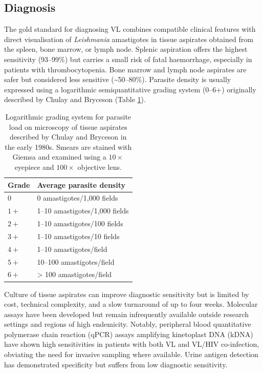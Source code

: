 \subsection{Diagnosis}

The gold standard for diagnosing VL combines compatible clinical features with direct visualisation of \textit{Leishmania} amastigotes in tissue aspirates obtained from the spleen, bone marrow, or lymph node. Splenic aspiration offers the highest sensitivity (93--99\%) but carries a small risk of fatal haemorrhage, especially in patients with thrombocytopenia\cite{sundar2002a, kager1983}. Bone marrow and lymph node aspirates are safer but considered less sensitive (\textasciitilde50--80\%)\cite{farrar2023manson,burza2018}. Parasite density is usually expressed using a logarithmic semiquantitative grading system (0--6+) originally described by Chulay and Bryceson (Table \ref{tab:grading})\cite{chulay1983}.


\begin{table}[ht]
  \centering
  \caption{Logarithmic grading system for parasite load on microscopy of tissue aspirates described by Chulay and Bryceson in the early 1980s\cite{chulay1983}. Smears are stained with Giemsa and examined using a $10\times$ eyepiece and $100\times$ objective lens.}
  \begin{tabular}{ll}
    \toprule
    \textbf{Grade} & \textbf{Average parasite density} \\
    \midrule
    $0$            & 0 amastigotes/1,000 fields        \\
    $1+$           & 1--10 amastigotes/1,000 fields    \\
    $2+$           & 1--10 amastigotes/100 fields      \\
    $3+$           & 1--10 amastigotes/10 fields       \\
    $4+$           & 1--10 amastigotes/field           \\
    $5+$           & 10--100 amastigotes/field         \\
    $6+$           & > 100 amastigotes/field           \\
    \bottomrule
  \end{tabular}
  \label{tab:grading}
\end{table}

Culture of tissue aspirates can improve diagnostic sensitivity but is limited by cost, technical complexity, and a slow turnaround of up to four weeks. Molecular assays have been developed but remain infrequently available outside research settings and regions of high endemicity. Notably, peripheral blood quantitative polymerase chain reaction (qPCR) assays amplifying kinetoplast DNA (kDNA) have shown high sensitivities in patients with both VL and VL/HIV co-infection\cite{galluzzi2018, rihs2025, verrest2024}, obviating the need for invasive sampling where available. Urine antigen detection has demonstrated specificity but suffers from low diagnostic sensitivity\cite{vangriensven2018, riera2004}.

